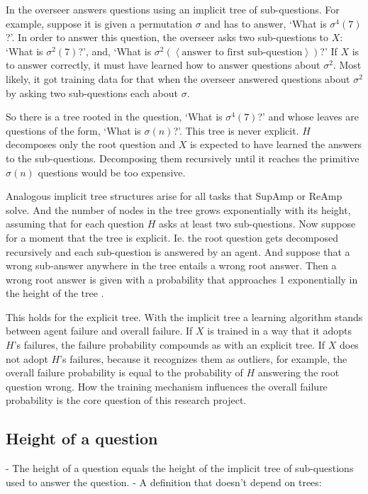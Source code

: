 \documentclass{farlamp}
\begin{document}
In \textcite{CSASupAmp} the overseer answers questions using an implicit tree of
sub-questions. For example, suppose it is given a permutation $\sigma$ and has
to answer, ‘What is $\sigma^4(7)$?’. In order to answer this question, the
overseer asks two sub-questions to $X$: ‘What is $\sigma^2(7)$?’, and, ‘What is
$\sigma^2(\left<\text{answer to first sub-question}\right>)$?’
If $X$ is to answer correctly, it must have learned how to answer questions
about $\sigma^2$. Most likely, it got training data for that when the overseer
answered questions about $\sigma^2$ by asking two sub-questions each about
$\sigma$.

So there is a tree rooted in the question, ‘What is $\sigma^4(7)$?’ and whose
leaves are questions of the form, ‘What is $\sigma(n)$?’. This tree is never
explicit. $H$ decomposes only the root question and $X$ is expected to have
learned the answers to the sub-questions. Decomposing them recursively until it
reaches the primitive $\sigma(n)$ questions would be too expensive.

Analogous implicit tree structures arise for all tasks that SupAmp or ReAmp
solve. And the number of nodes in the tree grows exponentially with its height,
assuming that for each question $H$ asks at least two sub-questions.
Now suppose for a moment that the tree is explicit. Ie. the root question gets
decomposed recursively and each sub-question is answered by an agent. And
suppose that a wrong sub-answer anywhere in the tree entails a wrong root
answer. Then a wrong root answer is given with a probability that approaches 1
exponentially in the height of the tree \parencite{ChriRelAmp}.

This holds for the explicit tree. With the implicit tree a learning algorithm
stands between agent failure and overall failure. If $X$ is trained in a way
that it adopts $H$'s failures, the failure probability compounds as with an
explicit tree. If $X$ does not adopt $H$'s failures, because it recognizes them
as outliers, for example, the overall failure probability is equal to the
probability of $H$ answering the root question wrong.
How the training mechanism influences the overall failure probability is the
core question of this research project.


\subsection{Height of a question}

- The height of a question equals the height of the implicit tree of
sub-questions used to answer the question.
- A definition that doesn't depend on trees:
\end{document}
